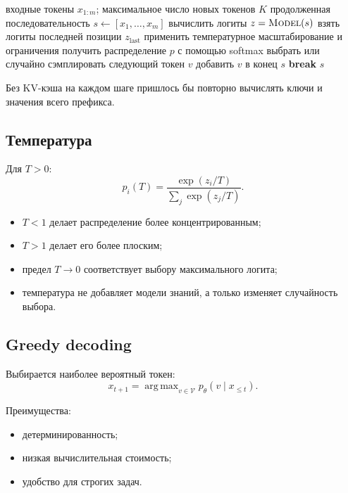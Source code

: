 \documentclass[12pt,a4paper]{article}
\DeclareMathOperator{\argmax}{arg\,max}
\newcommand{\V}{\mathcal{V}}
\newcommand{\1}{\mathbf{1}}
\theoremstyle{definition}
\theoremstyle{remark}
\begin{document}
\begin{algorithm}[h]
\caption{Авторегрессионная генерация}
\begin{algorithmic}[1]
\Require входные токены $x_{1:m}$; максимальное число новых токенов $K$
\Ensure продолженная последовательность
\State $s\gets[x_1,\ldots,x_m]$
    \State вычислить логиты $z=\Call{Model}{s}$
    \State взять логиты последней позиции $z_{\mathrm{last}}$
    \State применить температурное масштабирование и ограничения
    \State получить распределение $p$ с помощью softmax
    \State выбрать или случайно сэмплировать следующий токен $v$
    \State добавить $v$ в конец $s$
        \State \textbf{break}
    \EndIf
\EndFor
\State \Return $s$
\end{algorithmic}
\end{algorithm}

Без KV-кэша на каждом шаге пришлось бы повторно вычислять ключи и значения
всего префикса.

\subsection{Температура}

Для $T>0$:
\[
p_i(T)
=
\frac{\exp(z_i/T)}
{\sum_j\exp(z_j/T)}.
\]

\begin{itemize}
    \item $T<1$ делает распределение более концентрированным;
    \item $T>1$ делает его более плоским;
    \item предел $T\to0$ соответствует выбору максимального логита;
    \item температура не добавляет модели знаний, а только изменяет
    случайность выбора.
\end{itemize}

\subsection{Greedy decoding}

Выбирается наиболее вероятный токен:
\[
x_{t+1}
=
\argmax_{v\in\V}
p_\theta(v\mid x_{\leq t}).
\]

Преимущества:

\begin{itemize}
    \item детерминированность;
    \item низкая вычислительная стоимость;
    \item удобство для строгих задач.
\end{itemize}
\end{document}

